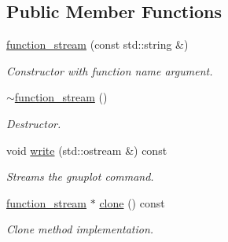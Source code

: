 \subsection*{Public Member Functions}
\begin{DoxyCompactItemize}
\item 
\hypertarget{a00231_a59de7b5974ccfe0fb665f35e7e956798}{\hyperlink{a00231_a59de7b5974ccfe0fb665f35e7e956798}{function\-\_\-stream} (const std\-::string \&)}\label{a00231_a59de7b5974ccfe0fb665f35e7e956798}

\begin{DoxyCompactList}\small\item\em Constructor with function name argument. \end{DoxyCompactList}\item 
\hypertarget{a00231_a7637a1801230e828c7615b6db0747cb9}{\hyperlink{a00231_a7637a1801230e828c7615b6db0747cb9}{$\sim$function\-\_\-stream} ()}\label{a00231_a7637a1801230e828c7615b6db0747cb9}

\begin{DoxyCompactList}\small\item\em Destructor. \end{DoxyCompactList}\item 
\hypertarget{a00231_aed0bf015c8f2f762f979c629698c968c}{void \hyperlink{a00231_aed0bf015c8f2f762f979c629698c968c}{write} (std\-::ostream \&) const }\label{a00231_aed0bf015c8f2f762f979c629698c968c}

\begin{DoxyCompactList}\small\item\em Streams the gnuplot command. \end{DoxyCompactList}\item 
\hypertarget{a00231_a69ee3b0afcaafeb0958aee52d0c82f39}{\hyperlink{a00231}{function\-\_\-stream} $\ast$ \hyperlink{a00231_a69ee3b0afcaafeb0958aee52d0c82f39}{clone} () const }\label{a00231_a69ee3b0afcaafeb0958aee52d0c82f39}

\begin{DoxyCompactList}\small\item\em Clone method implementation. \end{DoxyCompactList}\end{DoxyCompactItemize}
